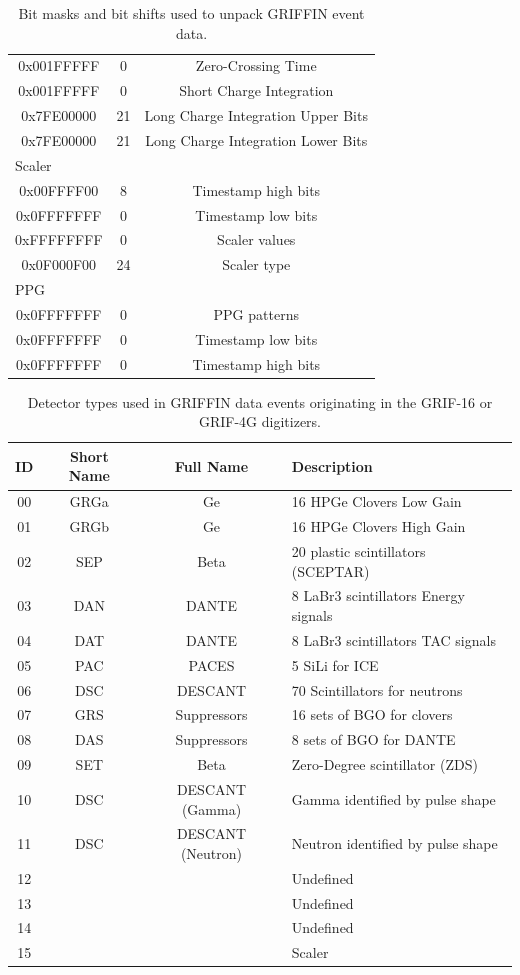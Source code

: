 \documentclass[letterpaper,12pt,notitlepage]{report}
\begin{document}
\begin{table}
\begin{center}
\begin{tabular}{ccc}
0x001FFFFF & 0 & Zero-Crossing Time\\
0x001FFFFF & 0 & Short Charge Integration\\
0x7FE00000 & 21 & Long Charge Integration Upper Bits\\
0x7FE00000 & 21 & Long Charge Integration Lower Bits\\
\hline
\multicolumn{3}{l}{Scaler}\\
\hline
0x00FFFF00 & 8 & Timestamp high bits\\
0x0FFFFFFF & 0 & Timestamp low bits\\
0xFFFFFFFF & 0 & Scaler values\\
0x0F000F00 & 24 & Scaler type\\
\hline
\multicolumn{3}{l}{PPG}\\
\hline
0x0FFFFFFF & 0 & PPG patterns\\
0x0FFFFFFF & 0 & Timestamp low bits\\
0x0FFFFFFF & 0 & Timestamp high bits\\
\hline
\hline
\end{tabular}
\caption{Bit masks and bit shifts used to unpack GRIFFIN event data.}
\label{table.bits}
\end{center}
\end{table}

\begin{table}
\begin{center}
\begin{tabular}{cccl}
\hline
\hline
ID & Short Name & Full Name & Description\\
\hline
00 & GRGa & Ge & 16 HPGe Clovers Low Gain\\
01 & GRGb & Ge & 16 HPGe Clovers High Gain\\
02 & SEP & Beta & 20 plastic scintillators (SCEPTAR)\\
03 & DAN & DANTE & 8 LaBr3 scintillators Energy signals\\
04 & DAT & DANTE & 8 LaBr3 scintillators TAC signals\\
05 & PAC & PACES & 5 SiLi for ICE\\
06 & DSC & DESCANT & 70 Scintillators for neutrons\\
07 & GRS & Suppressors & 16 sets of BGO for clovers\\
08 & DAS & Suppressors & 8 sets of BGO for DANTE\\
09 & SET & Beta & Zero-Degree scintillator (ZDS)\\
10 & DSC & DESCANT (Gamma) & Gamma identified by pulse shape\\
11 & DSC & DESCANT (Neutron) & Neutron identified by pulse shape\\
12 &  &  & Undefined\\
13 &  &  & Undefined\\
14 &  &  & Undefined\\
15 &  &  & Scaler\\
\hline
\hline
\end{tabular}
\caption{Detector types used in GRIFFIN data events originating in the GRIF-16 or GRIF-4G digitizers.}
\label{table.dettype_data}
\end{center}
\end{table}
\end{document}

